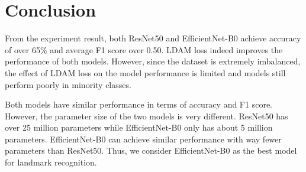 \documentclass[10pt,twocolumn,letterpaper]{article}
\begin{document}
\section{Conclusion}
From the experiment result, both ResNet50 and EfficientNet-B0 achieve accuracy of over 65\% and average F1 score over 0.50. LDAM loss indeed improves the performance of both models. However, since the dataset is extremely imbalanced, the effect of LDAM loss on the model performance is limited and models still perform poorly in minority classes.

Both models have similar performance in terms of accuracy and F1 score. However, the parameter size of the two models is very different. ResNet50 has over 25 million parameters while EfficientNet-B0 only has about 5 million parameters. EfficientNet-B0 can achieve similar performance with way fewer parameters than ResNet50. Thus, we consider EfficientNet-B0 as the best model for landmark recognition.

{\small


}
\end{document}
